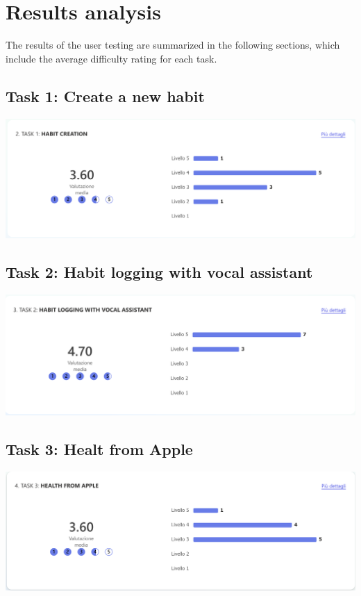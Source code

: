\documentclass{article}
\begin{document}
\section{Results analysis}
The results of the user testing are summarized in the following sections, which include the average difficulty rating for each task.
\subsection{Task 1: Create a new habit}
\begin{center}
  \includegraphics[width=\linewidth]{result_images/habit_creation_result.png}
\end{center}

\subsection{Task 2: Habit logging with vocal assistant}
\begin{center}
  \includegraphics[width=\linewidth]{result_images/habit_logging_with_vocal_result.png}
\end{center}

\subsection{Task 3: Healt from Apple}
\begin{center}
  \includegraphics[width=\linewidth]{result_images/helth_from_apple_result.png}
\end{center}
\end{document}
